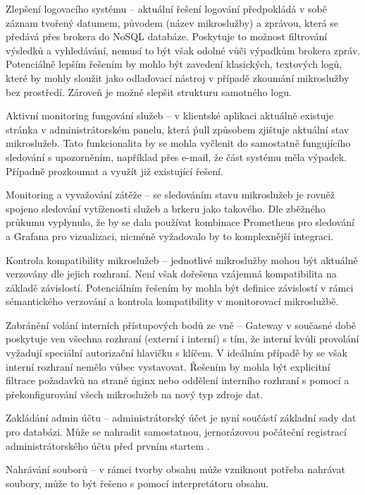 \begin{dl}
   \item[Zlepšení logovacího systému] – aktuální řešení logování předpokládá v sobě záznam tvořený datumem, původem (název mikroslužby) a zprávou, která se předává přes brokera do NoSQL databáze.
   Poskytuje to možnost filtrování výsledků a vyhledávání, nemusí to být však odolné vůči výpadkům brokera zpráv.
   Potenciálně lepším řešením by mohlo být zavedení klasických, textových logů, které by mohly sloužit jako odlaďovací nástroj v případě zkoumání mikroslužby bez prostředí.
   Zároveň je možné slepšit strukturu samotného logu.
   \item[Aktivní monitoring fungování služeb] – v klientské aplikaci aktuálně existuje stránka v administrátorském panelu, která \h{pull} způsobem zjištuje aktuální stav mikroslužeb.
   Tato funkcionalita by se mohla vyčlenit do samostatně fungujícího sledování s upozorněním, například přes e-mail, že část systému měla výpadek.
   Případně prozkoumat a využít již existující řešení.
   \item[Monitoring a vyvažování zátěže] – se sledováním stavu mikroslužeb je rovněž spojeno sledování vytíženosti služeb a brkeru jako takového.
   Dle zběžného průkumu vyplynulo, že by se dala používat kombinace \h{Prometheus} pro sledování a \h{Grafana} pro vizualizaci, nicméně vyžadovalo by to komplexnější integraci.
   \item[Kontrola kompatibility mikroslužeb] – jednotlivé mikroslužby mohou být aktuálně verzovány dle jejich rozhraní.
   Není však dořešena vzájemná kompatibilita na základě závislostí.
   Potenciálním řešením by mohla být definice závislostí v rámci sémantického verzování a kontrola kompatibility v monitorovací mikroslužbě.
   \item[Zabránění volání interních přístupových bodů ze vně] – Gateway v současné době poskytuje ven všechna  rozhraní (externí i interní) s tím, že interní kvůli provolání vyžadují speciální autorizační hlavičku s klíčem.
   V ideálním případě by se však interní rozhraní nemělo vůbec vystavovat.
   Řešením by mohla být explicitní filtrace požadavků na straně \h{nginx} nebo oddělení interního rozhraní s pomocí  a překonfigurování všech mikroslužeb na nový typ zdroje dat.
   \item[Zakládání admin účtu] – administrátorský účet je nyní součástí základní sady dat pro databázi.
   Může se nahradit samostatnou, jernorázovou počáteční registrací administrátorského účtu před prvním startem .
   \item[Nahrávání souborů] – v rámci tvorby obsahu může vzniknout potřeba nahrávat soubory, může to být řešeno s pomocí interpretátoru obsahu.

\end{dl}

